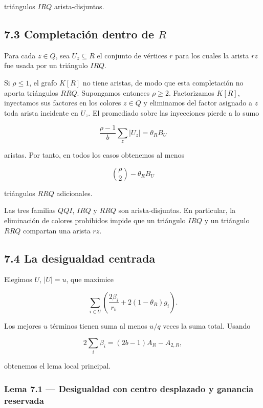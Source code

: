 \documentclass[
  11pt,
]{article}
\begin{document}
triángulos \(IRQ\) arista-disjuntos.

\subsection{\texorpdfstring{7.3 Completación dentro de
\(R\)}{7.3 Completación dentro de R}}\label{completaciuxf3n-dentro-de-r}

Para cada \(z\in Q\), sea \(U_z\subseteq R\) el conjunto de vértices
\(r\) para los cuales la arista \(rz\) fue usada por un triángulo
\(IRQ\).

Si \(\rho\le1\), el grafo \(K[R]\) no tiene aristas, de modo que esta
completación no aporta triángulos \(RRQ\). Supongamos entonces
\(\rho\ge2\). Factorizamos \(K[R]\), inyectamos sus factores en los
colores \(z\in Q\) y eliminamos del factor asignado a \(z\) toda arista
incidente en \(U_z\). El promediado sobre las inyecciones pierde a lo
sumo

\[
\frac{\rho-1}{b}\sum_z|U_z|
=
\theta_RB_U
\]

aristas. Por tanto, en todos los casos obtenemos al menos

\[
\binom\rho2-\theta_RB_U
\]

triángulos \(RRQ\) adicionales.

Las tres familias \(QQI\), \(IRQ\) y \(RRQ\) son arista-disjuntas. En
particular, la eliminación de colores prohibidos impide que un triángulo
\(IRQ\) y un triángulo \(RRQ\) compartan una arista \(rz\).

\subsection{7.4 La desigualdad centrada}\label{la-desigualdad-centrada}

Elegimos \(U\), \(|U|=u\), que maximice

\[
\sum_{i\in U}
\left(
\frac{2\beta_i}{r_b}+2(1-\theta_R)g_i
\right).
\]

Los mejores \(u\) términos tienen suma al menos \(u/q\) veces la suma
total. Usando

\[
2\sum_i\beta_i
=(2b-1)A_R-A_{2,R},
\]

obtenemos el lema local principal.

\subsubsection{Lema 7.1 --- Desigualdad con centro desplazado y ganancia
reservada}\label{lema-7.1-desigualdad-con-centro-desplazado-y-ganancia-reservada}
\end{document}
